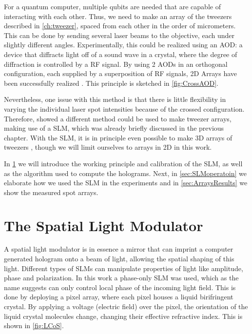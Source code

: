 For a quantum computer, multiple qubits are needed that are capable of interacting with each other. 
Thus, we need to make an array of the tweezers described in \cref{ch:tweezer}, spaced from each other in the order of micrometers. 
This can be done by sending several laser beams to the objective, each under slightly different angles. 
Experimentally, this could be realized using an \ac{AOD}: a device that diffracts light off of a sound wave in a crystal, where the degree of diffraction is controlled by a \ac{RF} signal. 
By using 2 AODs in an orthogonal configuration, each supplied by a superposition of RF signals, 2D Arrays have been successfully realized \cite{Manuel2016}. 
This principle is sketched in \cref{fig:CrossAOD}.

Nevertheless, one issue with this method is that there is little flexibility in varying the individual laser spot intensities because of the crossed configuration.
Therefore, \cite{Bergamini2004} showed a different method could be used to make tweezer arrays, making use of a \acf{SLM}, which was already briefly discussed in the previous chapter. 
With the SLM, it is in principle even possible to make 3D arrays of tweezers \cite{DiLeonardo2007,Barredo2016}, though we will limit ourselves to arrays in 2D in this work.

In \cref{sec:SLM} we will introduce the working principle and calibration of the SLM, as well as the algorithm used to compute the holograms. 
Next, in \cref{sec:SLMoperatoin} we elaborate how we used the SLM in the experiments and in \cref{sec:ArraysResults} we show the measured spot arrays.



\section{The Spatial Light Modulator}\label{sec:SLM}

A spatial light modulator is in essence a mirror that can imprint a computer generated hologram onto a beam of light, allowing the spatial shaping of this light.
Different types of SLMs can manipulate properties of light like amplitude, phase and polarization.
In this work a phase-only SLM was used, which as the name suggests can only control local phase of the incoming light field.
This is done by deploying a pixel array, where each pixel houses a liquid birifringent crystal.
By applying a voltage (electric field) over the pixel, the orientation of the liquid crystal molecules change, changing their effective refractive index.
This is shown in \cref{fig:LCoS}.

